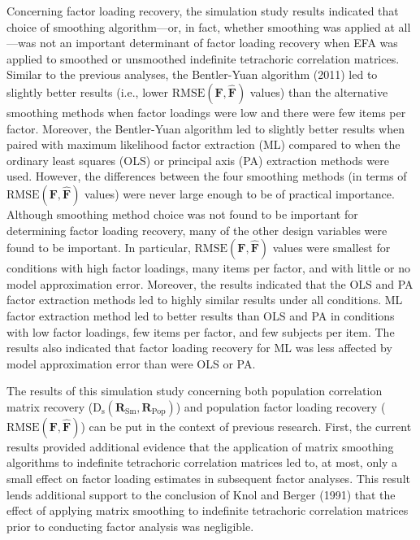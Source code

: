 \documentclass[
  english,
  man]{apa6}
\begin{document}
Concerning factor loading recovery, the simulation study results indicated that choice of smoothing algorithm---or, in fact, whether smoothing was applied at all---was not an important determinant of factor loading recovery when EFA was applied to smoothed or unsmoothed indefinite tetrachoric correlation matrices. Similar to the previous analyses, the Bentler-Yuan algorithm (2011) led to slightly better results (i.e., lower \(\textrm{RMSE}(\mathbf{F}, \hat{\mathbf{F}})\) values) than the alternative smoothing methods when factor loadings were low and there were few items per factor. Moreover, the Bentler-Yuan algorithm led to slightly better results when paired with maximum likelihood factor extraction (ML) compared to when the ordinary least squares (OLS) or principal axis (PA) extraction methods were used. However, the differences between the four smoothing methods (in terms of \(\textrm{RMSE}(\mathbf{F}, \hat{\mathbf{F}})\) values) were never large enough to be of practical importance. Although smoothing method choice was not found to be important for determining factor loading recovery, many of the other design variables were found to be important. In particular, \(\textrm{RMSE}(\mathbf{F}, \hat{\mathbf{F}})\) values were smallest for conditions with high factor loadings, many items per factor, and with little or no model approximation error. Moreover, the results indicated that the OLS and PA factor extraction methods led to highly similar results under all conditions. ML factor extraction method led to better results than OLS and PA in conditions with low factor loadings, few items per factor, and few subjects per item. The results also indicated that factor loading recovery for ML was less affected by model approximation error than were OLS or PA.

The results of this simulation study concerning both population correlation matrix recovery (\(\mathrm{D}_{\mathrm{s}}(\mathbf{R}_{\textrm{Sm}}, \mathbf{R}_{\textrm{Pop}})\)) and population factor loading recovery (\(\textrm{RMSE}(\mathbf{F}, \hat{\mathbf{F}})\)) can be put in the context of previous research. First, the current results provided additional evidence that the application of matrix smoothing algorithms to indefinite tetrachoric correlation matrices led to, at most, only a small effect on factor loading estimates in subsequent factor analyses. This result lends additional support to the conclusion of Knol and Berger (1991) that the effect of applying matrix smoothing to indefinite tetrachoric correlation matrices prior to conducting factor analysis was negligible.
\end{document}
